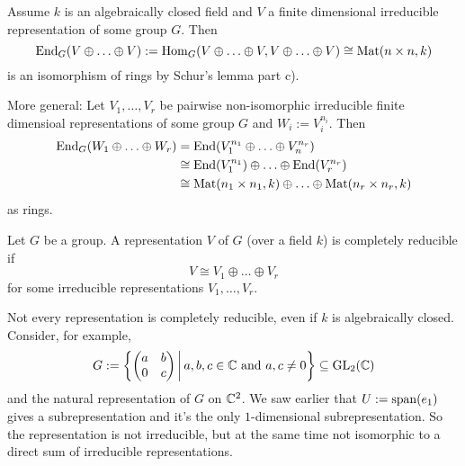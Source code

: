 \begin{rem}
 Assume $k$ is an algebraically closed field and $V$ a finite dimensional irreducible representation of some group $G$. Then
 \[
  \operatorname{End}_G(V \oplus \ldots \oplus V)
  := \operatorname{Hom}_G(V \oplus \ldots \oplus V, V \oplus \ldots \oplus V)
  \cong \operatorname{Mat}(n \times n, k)
 \]
 is an isomorphism of rings by Schur’s lemma part c).
 
 More general: Let $V_1, \ldots, V_r$ be pairwise non-isomorphic irreducible finite dimensioal representations of some group $G$ and $W_i := V_i^{n_i}$. Then
 \begin{align*}
  \operatorname{End}_G(W_1 \oplus \ldots \oplus W_r)
  &= \operatorname{End}(V_1^{n_1} \oplus \ldots \oplus V_n^{n_r}) \\
  &\cong \operatorname{End}(V_1^{n_1}) \oplus \ldots \oplus \operatorname{End}(V_r^{n_r}) \\
  &\cong \operatorname{Mat}(n_1 \times n_1, k) \oplus \ldots \oplus \operatorname{Mat}(n_r \times n_r, k)
 \end{align*}
 as rings.
\end{rem}


\begin{defi}
 Let $G$ be a group. A representation $V$ of $G$ (over a field $k$) is completely reducible if
 \[
  V \cong V_1 \oplus \ldots \oplus V_r
 \]
 for some irreducible representations $V_1, \ldots, V_r$.
\end{defi}


\begin{rem}
 Not every representation is completely reducible, even if $k$ is algebraically closed. Consider, for example,
 \[
  G := \left\{\begin{pmatrix}a & b \\ 0 & c\end{pmatrix} \,\middle|\, a,b,c \in \mathbb{C} \text{ and } a,c \neq 0\right\}
  \subseteq \operatorname{GL}_2(\mathbb{C})
 \]
 and the natural representation of $G$ on $\mathbb{C}^2$. We saw earlier that $U := \operatorname{span}(e_1)$ gives a subrepresentation and it’s the only $1$-dimensional subrepresentation. So the representation is not irreducible, but at the same time not isomorphic to a direct sum of irreducible representations.
\end{rem}



